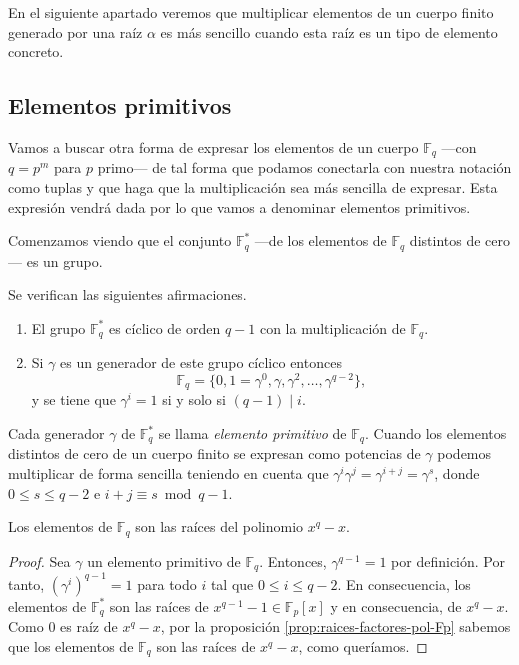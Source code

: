 En el siguiente apartado veremos que multiplicar elementos de un cuerpo finito generado por una raíz \(\alpha\) es más sencillo cuando esta raíz es un tipo de elemento concreto.

\subsection{Elementos primitivos}

Vamos a buscar otra forma de expresar los elementos de un cuerpo \(\mathbb F_q\) —con \(q = p^m\) para \(p\) primo— de tal forma que podamos conectarla con nuestra notación como tuplas y que haga que la multiplicación sea más sencilla de expresar.
Esta expresión vendrá dada por lo que vamos a denominar elementos primitivos.

Comenzamos viendo que el conjunto \(\mathbb F_q^*\) —de los elementos de \(\mathbb F_q\) distintos de cero— es un grupo.

\begin{theorem}
  \label{th:Fq-ast-cilcico}
  Se verifican las siguientes afirmaciones.
  \begin{enumerate}
    \item El grupo \(\mathbb F_q^*\) es cíclico de orden \(q - 1\) con la multiplicación de \(\mathbb F_q\).
    \item Si \(\gamma\) es un generador de este grupo cíclico entonces
    \[
      \mathbb F_q = \{0, 1 = \gamma^0, \gamma, \gamma^2, \dots, \gamma^{q-2}\},
    \] y se tiene que \(\gamma^i = 1\) si y solo si \((q-1) \mid i\).
  \end{enumerate}
\end{theorem}

Cada generador \(\gamma\) de \(\mathbb F_q^*\) se llama \textit{elemento primitivo} de \(\mathbb F_q\).
Cuando los elementos distintos de cero de un cuerpo finito se expresan como potencias de \(\gamma\) podemos multiplicar de forma sencilla teniendo en cuenta que \(\gamma^i\gamma^j = \gamma^{i+j} = \gamma^s\), donde \(0 \leq s \leq q-2\) e \(i + j \equiv s \bmod q - 1\).

\begin{theorem}
  \label{th:el-Fq-raices-pol}
  Los elementos de \(\mathbb F_q\) son las raíces del polinomio \(x^q - x\).
\end{theorem}

\begin{proof}
  Sea \(\gamma\) un elemento primitivo de \(\mathbb F_q\).
  Entonces, \(\gamma^{q-1} = 1\) por definición.
  Por tanto, \((\gamma^i)^{q-1} = 1\) para todo \(i\) tal que \(0 \leq i \leq q - 2\).
  En consecuencia, los elementos de \(\mathbb F_q^*\) son las raíces de \(x^{q-1}-1 \in \mathbb F_p[x]\) y en consecuencia, de \(x^q - x\).
  Como \(0\) es raíz de \(x^q - x\), por la proposición \ref{prop:raices-factores-pol-Fp} sabemos que los elementos de \(\mathbb F_q\) son las raíces de \(x^q - x\), como queríamos.
\end{proof}

